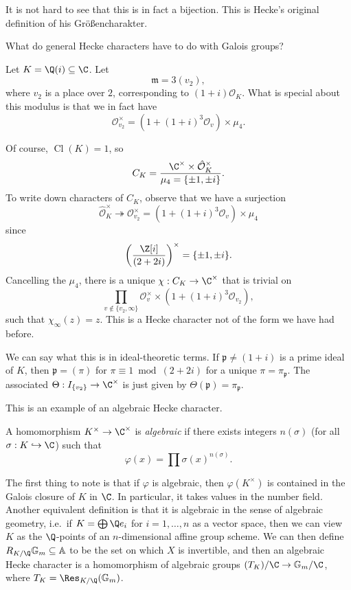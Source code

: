 \documentclass[a4paper]{article}
\renewcommand\G{\mathbb{G}}
\newcommand\A{\mathbb{A}}
\DeclareMathOperator\Cl{\mathrm{Cl}}
\begin{document}
It is not hard to see that this is in fact a bijection. This is Hecke's original definition of his Gr\"o{\ss}encharakter.

What do general Hecke characters have to do with Galois groups?
\begin{eg}
  Let $K = \Q(i) \subseteq \C$. Let
  \[
    \mathfrak{m} = 3 (v_2),
  \]
  where $v_2$ is a place over $2$, corresponding to $(1 + i) \mathcal{O}_K$. What is special about this modulus is that we in fact have
  \[
    \mathcal{O}_{v_2}^\times = (1 + (1 + i)^3 \mathcal{O}_v) \times \mu_4.
  \]

  Of course, $\Cl(K) = 1$, so
  \[
    C_K = \frac{\C^\times \times \hat{\mathcal{O}}_K^\times}{\mu_4 = \{\pm 1, \pm i\}}.
  \]
  To write down characters of $C_K$, observe that we have a surjection
  \[
    \hat{\mathcal{O}}_K^\times \twoheadrightarrow \mathcal{O}_{v_2}^\times = (1 + (1 + i)^3 \mathcal{O}_v) \times \mu_4
  \]
  since
  \[
    \left(\frac{\Z[i]}{(2 + 2i)}\right)^\times = \{\pm 1, \pm i\}.
  \]
  Cancelling the $\mu_4$, there is a unique $\chi: C_K \to \C^\times$ that is trivial on
  \[
    \prod_{v \not \in \{v_2, \infty\}} \mathcal{O}_v^\times \times (1 + (1 + i)^3 \mathcal{O}_{v_2}),
  \]
  such that $\chi_\infty(z) = z$. This is a Hecke character not of the form we have had before.

  We can say what this is in ideal-theoretic terms. If $\mathfrak{p} \not= (1 + i)$ is a prime ideal of $K$, then $\mathfrak{p} = (\pi)$ for $\pi \equiv 1 \bmod (2 + 2i)$ for a unique $\pi = \pi_\mathfrak{p}$. The associated $\Theta: I_{\{v_2\}} \to \C^\times$ is just given by $\Theta(\mathfrak{p}) = \pi_\mathfrak{p}$.

  This is an example of an algebraic Hecke character.
\end{eg}

\begin{defi}
  A homomorphism $K^\times \to \C^\times$ is \emph{algebraic} if there exists integers $n(\sigma)$ (for all $\sigma: K \hookrightarrow \C$) such that
  \[
    \varphi(x) = \prod \sigma(x)^{n(\sigma)}.
  \]
\end{defi}
The first thing to note is that if $\varphi$ is algebraic, then $\varphi(K^\times)$ is contained in the Galois closure of $K$ in $\C$. In particular, it takes values in the number field. Another equivalent definition is that it is algebraic in the sense of algebraic geometry, i.e.\ if $K = \bigoplus \Q e_i$ for $i = 1, \ldots, n$ as a vector space, then we can view $K$ as the $\Q$-points of an $n$-dimensional affine group scheme. We can then define $R_{K/\Q} \G_m \subseteq \A$ to be the set on which $X$ is invertible, and then an algebraic Hecke character is a homomorphism of algebraic groups $(T_K)/\C \to \G_m/\C$, where $T_K = \Res_{K/\Q}(\G_m)$.
\end{document}
